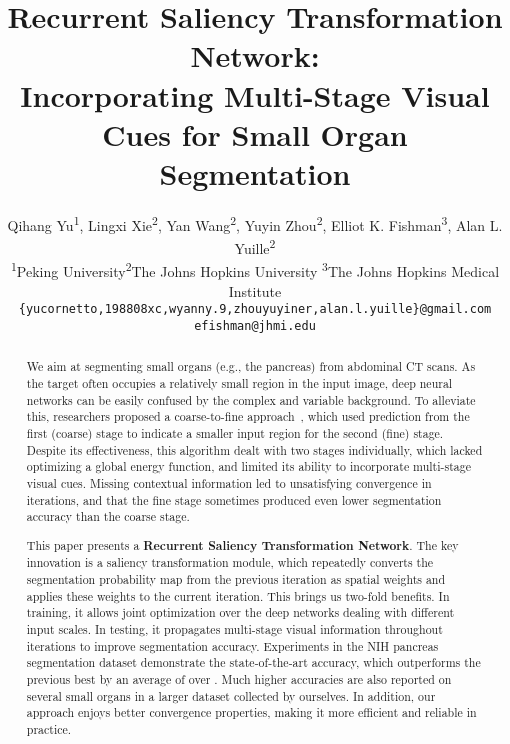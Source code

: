 \documentclass[10pt,twocolumn,letterpaper]{article}
\begin{document}
\title{Recurrent Saliency Transformation Network: \\ Incorporating Multi-Stage Visual Cues for Small Organ Segmentation}

\author{Qihang Yu\textsuperscript{1}, Lingxi Xie\textsuperscript{2}, Yan Wang\textsuperscript{2},
Yuyin Zhou\textsuperscript{2}, Elliot K. Fishman\textsuperscript{3}, Alan L. Yuille\textsuperscript{2}\\
\textsuperscript{1}Peking University\quad\textsuperscript{2}The Johns Hopkins University\quad
\textsuperscript{3}The Johns Hopkins Medical Institute\\
{\tt\small \{yucornetto,198808xc,wyanny.9,zhouyuyiner,alan.l.yuille\}@gmail.com}\quad
{\tt\small efishman@jhmi.edu}\\
}

\maketitle


\begin{abstract}
We aim at segmenting small organs (e.g., the pancreas) from abdominal CT scans.
As the target often occupies a relatively small region in the input image,
deep neural networks can be easily confused by the complex and variable background.
To alleviate this, researchers proposed a coarse-to-fine approach~\cite{Zhou_2017_Fixed},
which used prediction from the first (coarse) stage to indicate a smaller input region for the second (fine) stage.
Despite its effectiveness, this algorithm dealt with two stages individually,
which lacked optimizing a global energy function, and limited its ability to incorporate multi-stage visual cues.
Missing contextual information led to unsatisfying convergence in iterations,
and that the fine stage sometimes produced even lower segmentation accuracy than the coarse stage.

This paper presents a {\bf Recurrent Saliency Transformation Network}.
The key innovation is a saliency transformation module,
which repeatedly converts the segmentation probability map from the previous iteration as spatial weights
and applies these weights to the current iteration.
This brings us two-fold benefits.
In training, it allows joint optimization over the deep networks dealing with different input scales.
In testing, it propagates multi-stage visual information throughout iterations to improve segmentation accuracy.
Experiments in the NIH pancreas segmentation dataset demonstrate the state-of-the-art accuracy,
which outperforms the previous best by an average of over .
Much higher accuracies are also reported on several small organs in a larger dataset collected by ourselves.
In addition, our approach enjoys better convergence properties, making it more efficient and reliable in practice.
\end{abstract}
\end{document}
